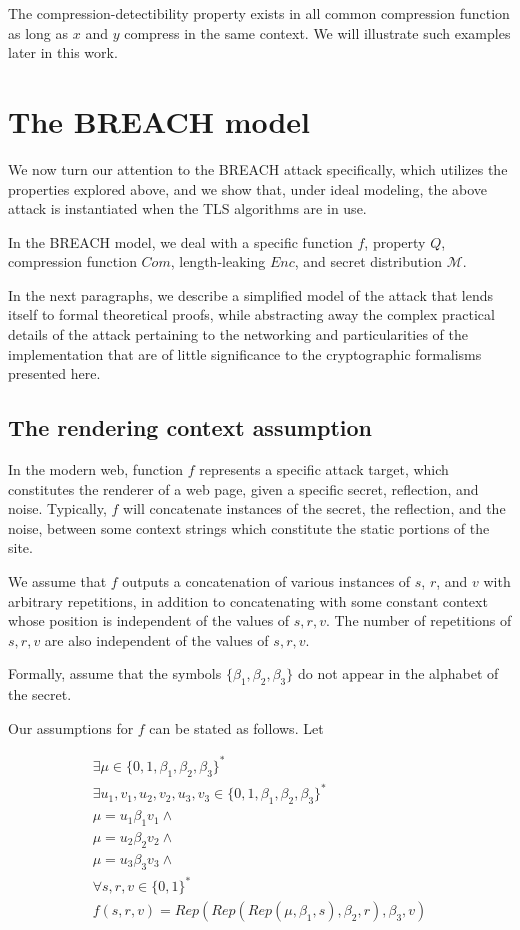 \documentclass{article}
\begin{document}
The compression-detectibility property exists in all common compression function
as long as $x$ and $y$ compress in the same context. We will illustrate such examples later in this work.

\section{The BREACH model}
We now turn our attention to the BREACH attack specifically, which utilizes
the properties explored above, and we show that, under ideal modeling,
the above attack is instantiated when the TLS algorithms are in use.

In the BREACH model, we deal with a specific function $f$, property $Q$,
compression function $Com$, length-leaking $Enc$, and secret distribution
$\mathcal{M}$.

In the next paragraphs, we describe a simplified model of the attack that
lends itself to formal theoretical proofs, while abstracting away the complex
practical details of the attack pertaining to the networking and particularities
of the implementation that are of little significance to the cryptographic
formalisms presented here.

\subsection{The rendering context assumption}

In the modern web, function $f$ represents a specific attack target, which
constitutes the renderer of a web page, given a specific secret, reflection,
and noise. Typically, $f$ will concatenate instances of the secret, the
reflection, and the noise, between some context strings which constitute the
static portions of the site.

We assume that $f$ outputs a concatenation of various instances of
$s$, $r$, and $v$ with arbitrary repetitions, in addition to concatenating with some
constant context whose position is independent of the values of $s, r, v$.
The number of repetitions of $s, r, v$ are also independent of the values of
$s, r, v$.

Formally, assume that the symbols $\{\beta_1, \beta_2, \beta_3\}$ do not appear in the
alphabet of the secret.

Our assumptions for $f$ can be stated as follows. Let

\begin{equation*}
\begin{split}
\exists \mu \in \{0, 1, \beta_1, \beta_2, \beta_3\}^*\\
\exists u_1, v_1, u_2, v_2, u_3, v_3 \in \{0, 1, \beta_1, \beta_2, \beta_3\}^*\\
\mu = u_1 \beta_1 v_1 \land\\
\mu = u_2 \beta_2 v_2 \land\\
\mu = u_3 \beta_3 v_3 \land\\
\forall s, r, v \in \{0, 1\}^*\\
f(s, r, v) = Rep(Rep(Rep(\mu, \beta_1, s), \beta_2, r), \beta_3, v)
\end{split}
\end{equation*}
\end{document}
